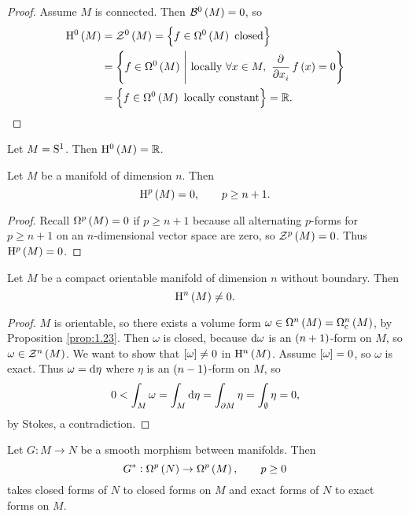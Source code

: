 \begin{proof}
Assume $ M $ is connected. Then $ \BBB^0\br{M} = 0 $, so
\begin{align*}
\H^0\br{M}
& = \ZZZ^0\br{M}
= \cbr{f \in \Omega^0\br{M} \ \text{closed}} \\
& = \cbr{f \in \Omega^0\br{M} \st \text{locally} \ \forall x \in M, \ \dpd{}{x_i}f\br{x} = 0} \\
& = \cbr{f \in \Omega^0\br{M} \ \text{locally constant}}
= \RR.
\end{align*}
\end{proof}

\begin{example*}
Let $ M = \S^1 $. Then $ \H^0\br{M} = \RR $.
\end{example*}

\begin{proposition}
\label{prop:2.5}
Let $ M $ be a manifold of dimension $ n $. Then
$$ \H^p\br{M} = 0, \qquad p \ge n + 1. $$
\end{proposition}

\begin{proof}
Recall $ \Omega^p\br{M} = 0 $ if $ p \ge n + 1 $ because all alternating $ p $-forms for $ p \ge n + 1 $ on an $ n $-dimensional vector space are zero, so $ \ZZZ^p\br{M} = 0 $. Thus $ \H^p\br{M} = 0 $.
\end{proof}

\begin{proposition}
Let $ M $ be a compact orientable manifold of dimension $ n $ without boundary. Then
$$ \H^n\br{M} \ne 0. $$
\end{proposition}

\begin{proof}
$ M $ is orientable, so there exists a volume form $ \omega \in \Omega^n\br{M} = \Omega_\c^n\br{M} $, by Proposition \ref{prop:1.23}. Then $ \omega $ is closed, because $ \d\omega $ is an $ \br{n + 1} $-form on $ M $, so $ \omega \in \ZZZ^n\br{M} $. We want to show that $ \sbr{\omega} \ne 0 $ in $ \H^n\br{M} $. Assume $ \sbr{\omega} = 0 $, so $ \omega $ is exact. Thus $ \omega = \d\eta $ where $ \eta $ is an $ \br{n - 1} $-form on $ M $, so
$$ 0 < \int_M \omega = \int_M \d\eta = \int_{\partial M} \eta = \int_\emptyset \eta = 0, $$
by Stokes, a contradiction.
\end{proof}

\pagebreak

\begin{proposition}
\label{prop:2.7}
Let $ G : M \to N $ be a smooth morphism between manifolds. Then
$$ G^* : \Omega^p\br{N} \to \Omega^p\br{M}, \qquad p \ge 0 $$
takes closed forms of $ N $ to closed forms on $ M $ and exact forms of $ N $ to exact forms on $ M $.
\end{proposition}

